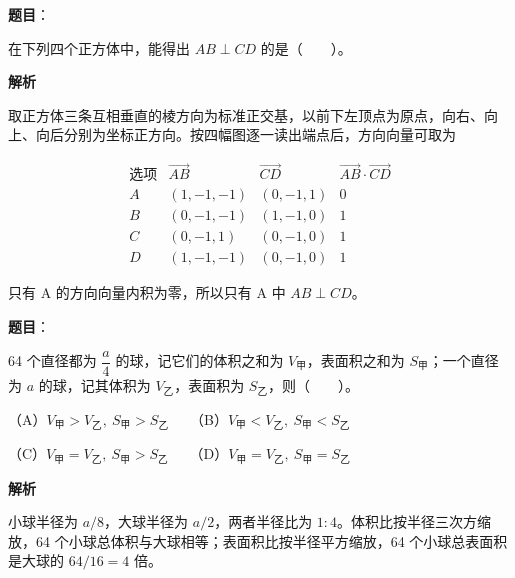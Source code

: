\begin{answer}

\textbf{题目}：

在下列四个正方体中，能得出 \(AB\perp CD\) 的是\mbox{（　　）}。
\nopagebreak[4]
\begin{center}\end{center}
\nopagebreak[4]
\textbf{解析}

取正方体三条互相垂直的棱方向为标准正交基，以前下左顶点为原点，向右、向上、向后分别为坐标正方向。按四幅图逐一读出端点后，方向向量可取为

\nopagebreak[4]
\[\begin{array}{c|c|c|c}
\text{选项}&\overrightarrow{AB}&\overrightarrow{CD}&\overrightarrow{AB}\cdot\overrightarrow{CD}\\\hline
A&(1,-1,-1)&(0,-1,1)&0\\
B&(0,-1,-1)&(1,-1,0)&1\\
C&(0,-1,1)&(0,-1,0)&1\\
D&(1,-1,-1)&(0,-1,0)&1
\end{array}\]

只有 A 的方向向量内积为零，所以只有 A 中 $AB\perp CD$。


\end{answer}
\begin{answer}

\textbf{题目}：

64 个直径都为 \(\dfrac a4\) 的球，记它们的体积之和为 \(V_{\text{甲}}\)，表面积之和为 \(S_{\text{甲}}\)；一个直径为 \(a\) 的球，记其体积为 \(V_{\text{乙}}\)，表面积为 \(S_{\text{乙}}\)，则\mbox{（　　）}。

（A）\(V_{\text{甲}}>V_{\text{乙}},\ S_{\text{甲}}>S_{\text{乙}}\)　　（B）\(V_{\text{甲}}<V_{\text{乙}},\ S_{\text{甲}}<S_{\text{乙}}\)

（C）\(V_{\text{甲}}=V_{\text{乙}},\ S_{\text{甲}}>S_{\text{乙}}\)　　（D）\(V_{\text{甲}}=V_{\text{乙}},\ S_{\text{甲}}=S_{\text{乙}}\)

\textbf{解析}

小球半径为 $a/8$，大球半径为 $a/2$，两者半径比为 $1:4$。体积比按半径三次方缩放，64 个小球总体积与大球相等；表面积比按半径平方缩放，64 个小球总表面积是大球的 $64/16=4$ 倍。


\end{answer}
